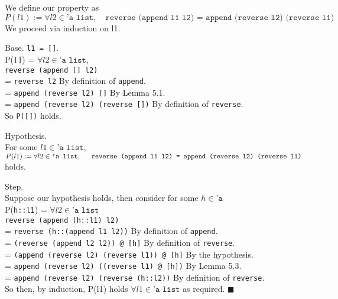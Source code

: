 \documentclass{article}
\begin{document}
\noindent
We define our property as
\[ P(l1) := \forall l2 \in \texttt{'a list}, \quad \texttt{reverse (append l1 l2) = append (reverse l2) (reverse l1)} \]
We proceed via induction on l1.

\bigskip

\noindent
Base. \texttt{l1 = []}. \\
\indent P(\texttt{[]}) = $\forall l2 \in \texttt{'a list}$, \\
\indent \texttt{reverse (append [] l2)} \\
\indent = \texttt{reverse l2} \qquad By definition of \texttt{append}. \\
\indent = \texttt{append (reverse l2) []} \qquad By Lemma 5.1. \\
\indent = \texttt{append (reverse l2) (reverse [])} \qquad By definition of \texttt{reverse}. \\
\noindent So \texttt{P([])} holds.

\bigskip

\noindent
Hypothesis. \\
\indent For some $l1 \in \texttt{'a list}$, $P(l1) := \forall l2 \in \texttt{'a list}, \\
\indent \texttt{reverse (append l1 l2) = append (reverse l2) (reverse l1)}$ holds.

\bigskip

\noindent
Step. \\
Suppose our hypothesis holds, then consider for some $h \in \texttt{'a}$ \\
\indent P(\texttt{h::l1}) = $\forall l2 \in \texttt{'a list}$ \\
\indent \texttt{reverse (append (h::l1) l2)} \\
\indent = \texttt{reverse (h::(append l1 l2))} \qquad By definition of \texttt{append}. \\
\indent = \texttt{(reverse (append l2 l2)) @ [h]} \qquad By definition of \texttt{reverse}. \\
\indent = \texttt{(append (reverse l2) (reverse l1)) @ [h]} \qquad By the hypothesis. \\
\indent = \texttt{append (reverse l2) ((reverse l1) @ [h])} \qquad By Lemma 5.3. \\
\indent = \texttt{append (reverse l2) (reverse (h::l2))} \qquad By definition of \texttt{reverse}. \\
\noindent So then, by induction, P(l1) holds $\forall l1 \in \texttt{'a list}$ as
required. $\blacksquare$
\end{document}
